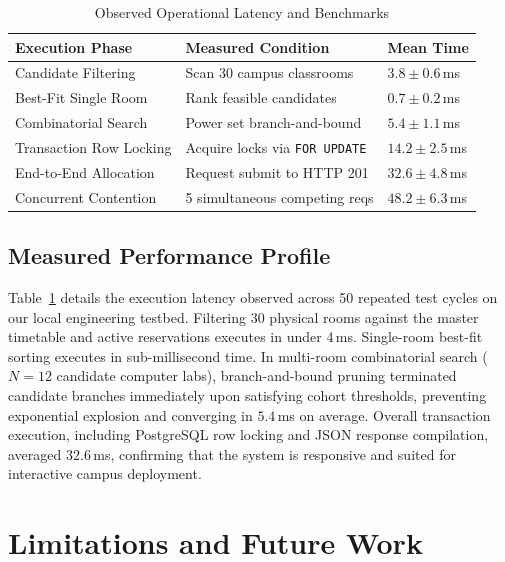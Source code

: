 \documentclass[conference]{IEEEtran}
\begin{document}
\begin{table}[t]
\caption{Observed Operational Latency and Benchmarks}
\label{tab:benchmarks}
\centering
\small
\begin{tabular}{p{2.8cm} p{3.4cm} p{1.8cm}}
\toprule
\textbf{Execution Phase} & \textbf{Measured Condition} & \textbf{Mean Time} \\
\midrule
Candidate Filtering & Scan 30 campus classrooms & $3.8 \pm 0.6$\,ms \\
Best-Fit Single Room & Rank feasible candidates & $0.7 \pm 0.2$\,ms \\
Combinatorial Search & Power set branch-and-bound & $5.4 \pm 1.1$\,ms \\
Transaction Row Locking & Acquire locks via \texttt{FOR UPDATE} & $14.2 \pm 2.5$\,ms \\
End-to-End Allocation & Request submit to HTTP 201 & $32.6 \pm 4.8$\,ms \\
Concurrent Contention & 5 simultaneous competing reqs & $48.2 \pm 6.3$\,ms \\
\bottomrule
\end{tabular}
\end{table}

\subsection{Measured Performance Profile}
Table~\ref{tab:benchmarks} details the execution latency observed across 50 repeated test cycles on our local engineering testbed. Filtering 30 physical rooms against the master timetable and active reservations executes in under 4\,ms. Single-room best-fit sorting executes in sub-millisecond time. In multi-room combinatorial search ($N=12$ candidate computer labs), branch-and-bound pruning terminated candidate branches immediately upon satisfying cohort thresholds, preventing exponential explosion and converging in $5.4$\,ms on average. Overall transaction execution, including PostgreSQL row locking and JSON response compilation, averaged $32.6$\,ms, confirming that the system is responsive and suited for interactive campus deployment.

\section{Limitations and Future Work}
\end{document}
